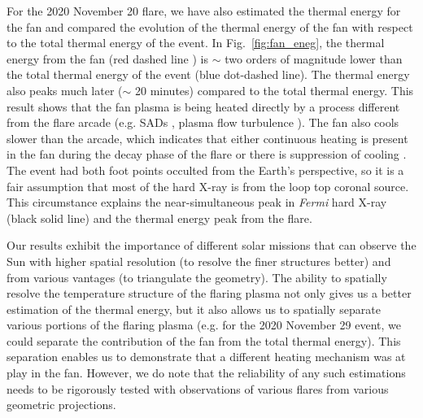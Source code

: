 For the 2020 November 20 flare, we have also estimated the thermal energy for the fan and compared the evolution of the thermal energy of the fan with respect to the total thermal energy of the event. %
In Fig.~\ref{fig:fan_eneg}, the thermal energy from the fan (red dashed line ) is $\sim$ two orders of magnitude lower than the total thermal energy of the event (blue dot-dashed line). The thermal energy also peaks much later ($\sim$ 20 minutes) compared to the total thermal energy. This result shows that the fan plasma is being heated directly by a process different from the flare arcade (e.g. SADs \citep{reeves17}, plasma flow turbulence \citep{xie23}). The fan also cools slower than the arcade, which indicates that either continuous heating is present in the fan during the decay phase of the flare or there is suppression of cooling \citep[e.g.][]{xie23}. The event had both foot points occulted from the Earth's perspective, so it is a fair assumption that most of the hard X-ray is from the loop top coronal source. This circumstance explains the near-simultaneous peak in {\it Fermi} hard X-ray (black solid line) and the thermal energy peak from the flare.

Our results exhibit the importance of different solar missions that can observe the Sun with higher spatial resolution (to resolve the finer structures better) and from various vantages (to triangulate the geometry). The ability to spatially resolve the temperature structure of the flaring plasma not only gives us a better estimation of the thermal energy, but it also allows us to spatially separate various portions of the flaring plasma (e.g. for the 2020 November 29 event, we could separate the contribution of the fan from the total thermal energy). This separation enables us to demonstrate that a different heating mechanism was at play in the fan. However, we do note that the reliability of any such estimations needs to be rigorously tested with observations of various flares from various geometric projections.


